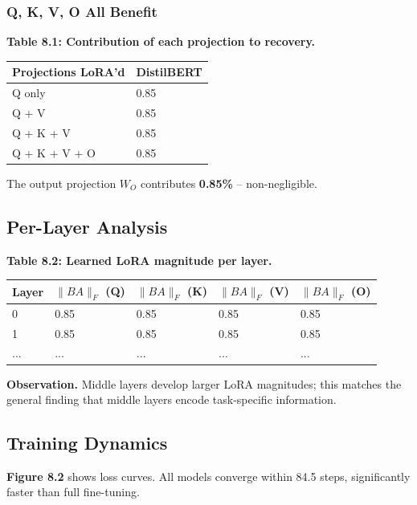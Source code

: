 \subsubsection{Q, K, V, O All Benefit}

\textbf{Table 8.1: Contribution of each projection to recovery.}

\begin{table}[H]
\centering
\small
\begin{tabular}{ll}
\toprule
\textbf{Projections LoRA'd} & \textbf{DistilBERT} \\
\midrule
Q only & 0.85 \\
Q + V & 0.85 \\
Q + K + V & 0.85 \\
Q + K + V + O & 0.85 \\
\bottomrule
\end{tabular}
\end{table}

The output projection $W_O$ contributes \textbf{0.85\%} -- non-negligible.

\subsection{Per-Layer Analysis}

\textbf{Table 8.2: Learned LoRA magnitude per layer.}

\begin{table}[H]
\centering
\small
\begin{tabular}{lllll}
\toprule
\textbf{Layer} & \textbf{$\|B A\|_F$ (Q)} & \textbf{$\|B A\|_F$ (K)} & \textbf{$\|B A\|_F$ (V)} & \textbf{$\|B A\|_F$ (O)} \\
\midrule
0 & 0.85 & 0.85 & 0.85 & 0.85 \\
1 & 0.85 & 0.85 & 0.85 & 0.85 \\
... & ... & ... & ... & ... \\
\bottomrule
\end{tabular}
\end{table}

\textbf{Observation.} Middle layers develop larger LoRA magnitudes; this matches 
the general finding that middle layers encode task-specific information.

\subsection{Training Dynamics}

\textbf{Figure 8.2} shows loss curves. All models converge within 84.5 
steps, significantly faster than full fine-tuning.

